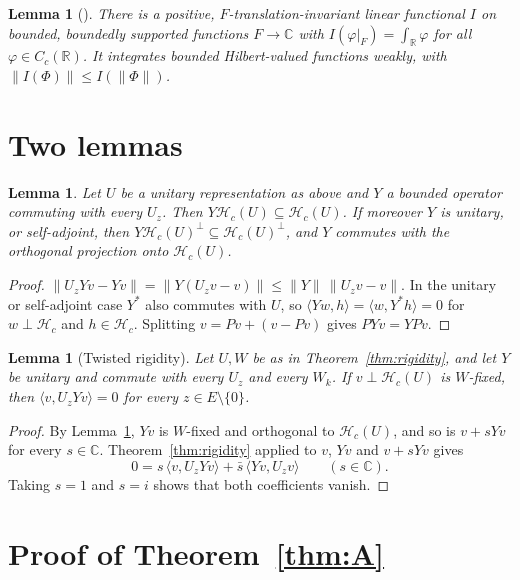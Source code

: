 \documentclass[11pt]{amsart}
\newtheorem{lemma}[theorem]{Lemma}
\theoremstyle{definition}
\newcommand{\R}{\mathbb{R}}
\newcommand{\C}{\mathbb{C}}
\newcommand{\cH}{\mathcal{H}}
\begin{document}
\begin{lemma}[{\cite[\S2.2]{OAI}}]\label{lem:mean}
There is a positive, $F$-translation-invariant linear functional $I$ on bounded, boundedly supported functions $F\to\C$ with $I(\varphi|_F)=\int_\R\varphi$ for all $\varphi\in C_c(\R)$. It integrates bounded Hilbert-valued functions weakly, with $\|I(\Phi)\|\le I(\|\Phi\|)$.
\end{lemma}

\section{Two lemmas}

\begin{lemma}\label{lem:comm}
Let $U$ be a unitary representation as above and $Y$ a bounded operator commuting with every $U_z$. Then $Y\cH_c(U)\subseteq\cH_c(U)$. If moreover $Y$ is unitary, or self-adjoint, then $Y\cH_c(U)^\perp\subseteq\cH_c(U)^\perp$, and $Y$ commutes with the orthogonal projection onto $\cH_c(U)$.
\end{lemma}

\begin{proof}
$\|U_zYv-Yv\|=\|Y(U_zv-v)\|\le\|Y\|\,\|U_zv-v\|$. In the unitary or self-adjoint case $Y^*$ also commutes with $U$, so $\langle Yw,h\rangle=\langle w,Y^*h\rangle=0$ for $w\perp\cH_c$ and $h\in\cH_c$. Splitting $v=Pv+(v-Pv)$ gives $PYv=YPv$.
\end{proof}

\begin{lemma}[Twisted rigidity]\label{lem:twisted}
Let $U,W$ be as in Theorem~\ref{thm:rigidity}, and let $Y$ be unitary and commute with every $U_z$ and every $W_k$. If $v\perp\cH_c(U)$ is $W$-fixed, then $\langle v,U_zYv\rangle=0$ for every $z\in E\setminus\{0\}$.
\end{lemma}

\begin{proof}
By Lemma~\ref{lem:comm}, $Yv$ is $W$-fixed and orthogonal to $\cH_c(U)$, and so is $v+sYv$ for every $s\in\C$. Theorem~\ref{thm:rigidity} applied to $v$, $Yv$ and $v+sYv$ gives
\[
0=s\,\langle v,U_zYv\rangle+\bar s\,\langle Yv,U_zv\rangle\qquad(s\in\C).
\]
Taking $s=1$ and $s=i$ shows that both coefficients vanish.
\end{proof}

\section{Proof of Theorem~\ref{thm:A}}\label{sec:proofA}
\end{document}
